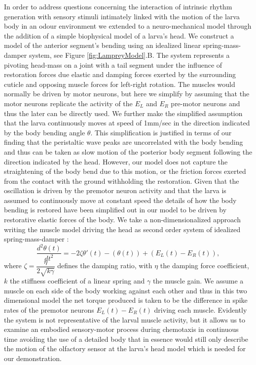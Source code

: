 \documentclass[10pt,a4paper]{article}
\begin{document}
In order to address questions concerning the interaction of intrinsic rhythm generation with sensory stimuli intimately linked with the motion of the larva body in an odour environment we extended to a neuro-mechanical model through the addition of a simple biophysical model of a larva's head. We construct a model of the anterior segment's bending using an idealized linear spring-mass-damper system, see Figure \ref{fig:LampreyModel}.B. The system represents a pivoting head-mass on a joint with a tail segment under the influence of restoration forces due elastic and damping forces exerted by the surrounding cuticle and opposing muscle forces for left-right rotation. The muscles would normally be driven by motor neurons, but here we simplify by assuming that the motor neurons replicate the activity of the $E_L$ and $E_R$ pre-motor neurons and thus the later can be directly used.
We further make the simplified assumption that the larva continuously moves at speed of 1mm/sec in the direction indicated by the body bending angle $\theta$. This simplification is justified in terms of our finding that the peristaltic wave peaks are uncorrelated with the body bending and thus can be taken as slow motion of the posterior body segment following the direction indicated by the head. However, our model does not capture the straightening of the body bend due to this motion, or the friction forces exerted from the contact with the ground withholding the restoration. Given that the oscillation is driven by the premotor neuron activity and that the larva is assumed to continuously move at constant speed the details of how the body bending is restored have been simplified out in our model to be driven by restorative elastic forces of the body. 
 We take a non-dimensionalized approach writing the muscle model driving the head as second order system of idealized spring-mass-damper \cite[see][]{fung2013biomechanics}:
\begin{equation}
\label{eqn:headmodel}
\frac{d^2\theta(t)}{dt^2} = - 2 \zeta \theta'(t) - (\theta(t)) + (E_L(t) - E_R(t)),
\end{equation}
where $\zeta= \dfrac{\eta}{ 2\sqrt{k \gamma}}$ defines the damping ratio, with $\eta$ the damping force coefficient, $k$ the stiffness coefficient of a linear spring and $\gamma$ the muscle gain.
We assume a muscle on each side of the body working against each other and thus in this two dimensional model the net torque produced is taken to be the difference in spike rates of the premotor neurons $E_L(t) - E_R(t)$ driving each muscle. 
Evidently the system is not representative of the larval muscle activity, but it allows us to examine an embodied sensory-motor process during chemotaxis in continuous time avoiding the use of a detailed body that in essence would still only describe the motion of the olfactory sensor at the larva's head model which is needed for our demonstration.
\end{document}

